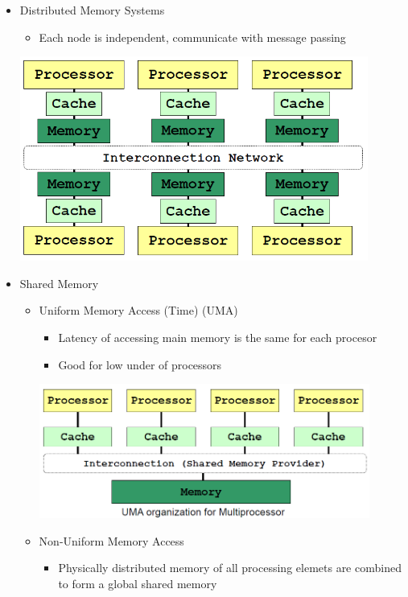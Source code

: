 \documentclass{article}
\begin{document}
\begin{itemize}
    \item Distributed Memory Systems
          \begin{itemize}
              \item Each node is independent, communicate with message passing
          \end{itemize}
          \includegraphics[width=0.9\textwidth]{l3_distributed_memory_system}
    \item Shared Memory
          \begin{itemize}
              \item Uniform Memory Access (Time) (UMA)
                    \begin{itemize}
                        \item Latency of accessing main memory is the same for each procesor
                        \item Good for low under of processors
                    \end{itemize}
                    \includegraphics[width=0.9\textwidth]{l3_uniform_memory_access}
              \item Non-Uniform Memory Access
                    \begin{itemize}
                        \item Physically distributed memory of all processing elemets are combined to form a global shared memory

\end{itemize}
\end{itemize}
\end{itemize}
\end{document}
